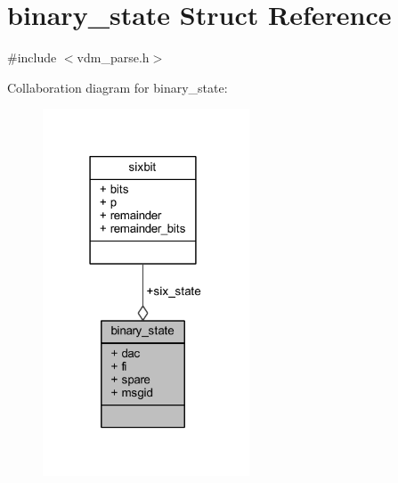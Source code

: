 \hypertarget{structbinary__state}{}\section{binary\+\_\+state Struct Reference}
\label{structbinary__state}


{\ttfamily \#include $<$vdm\+\_\+parse.\+h$>$}



Collaboration diagram for binary\+\_\+state\+:
\nopagebreak
\begin{figure}[H]
\begin{center}
\leavevmode
\includegraphics[width=174pt]{structbinary__state__coll__graph}
\end{center}
\end{figure}
